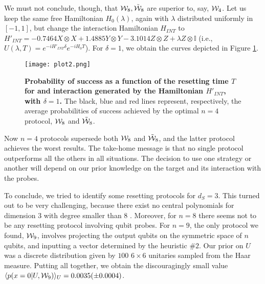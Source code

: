 \documentclass[twocolumn,prx,aps,longbibliography]{revtex4-1}
\def\id{{\mathbb I}}
\def\id{{\mathbb I}}
\begin{document}
\begin{appendix}
We must not conclude, though, that ${\cal W}_8,\tilde{{\cal W}}_8$ are superior to, say, ${\cal W}_4$. Let us keep the same free Hamiltonian $H_0(\lambda)$, again with $\lambda$ distributed uniformly in $[-1,1]$, but change the interaction Hamiltonian $H_{INT}$ to $H'_{INT}=-0.7464X\otimes X+1.4885Y\otimes Y-3.1014Z\otimes Z + \lambda Z\otimes \id$ (i.e., $U(\lambda,T)=e^{-iH'_{INT}\delta}e^{-iH_0T}$). For $\delta=1$, we obtain the curves depicted in Figure \ref{plot2}.

\begin{figure}
  \centering
  \texttt{[image: plot2.png]}
  \caption{\textbf{Probability of success as a function of the resetting time $T$ for and interaction generated by the Hamiltonian $H'_{INT}$, with $\delta=1$.} The black, blue and red lines represent, respectively, the average probabilities of success achieved by the optimal $n=4$ protocol, ${\cal W}_8$ and $\tilde{{\cal W}}_8$.}
  \label{plot2}
\end{figure}

\noindent Now $n=4$ protocols supersede both ${\cal W}_8$ and $\tilde{{\cal W}}_8$, and the latter protocol achieves the worst results. The take-home message is that no single protocol outperforms all the others in all situations. The decision to use one strategy or another will depend on our prior knowledge on the target and its interaction with the probes.


To conclude, we tried to identify some resetting protocols for $d_S=3$. This turned out to be very challenging, because there exist no central polynomials for dimension $3$ with degree smaller than $8$ \cite{polyId}. Moreover, for $n=8$ there seems not to be any resetting protocol involving qubit probes. For $n=9$, the only protocol we found, ${\cal W}_9$, involves projecting the output qubits on the symmetric space of $n$ qubits, and inputting a vector determined by the heuristic $\# 2$. Our prior on $U$ was a discrete distribution given by $100$ $6\times 6$ unitaries sampled from the Haar measure. Putting all together, we obtain the discouragingly small value $\langle p(x=0|U,{\cal W}_9)\rangle_U=0.0035(\pm 0.0004)$.


\end{appendix}


%

\end{document}
